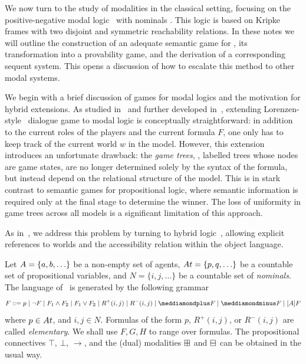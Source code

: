
We now turn to the study of modalities in the classical setting, focusing on the positive-negative modal logic \PNL\ with nominals \cite{DBLP:journals/jolli/XiongA20,DBLP:journals/logcom/PedersenSA21}. This logic is based on Kripke frames with two disjoint and symmetric reachability relations. In these notes we will outline the construction of an adequate semantic game for \PNL, its transformation into a provability game, and the derivation of a corresponding sequent system. This opens a discussion of how to escalate this method to other modal systems.

We begin with a brief discussion of games for modal logics and the motivation for hybrid extensions. As studied in~\cite{blackburn-synthese} and further developed in~\cite{Robert-PhD}, extending Lorenzen-style~\cite{Lorenzen1978-LORDLJ-2} dialogue game to modal logic is conceptually straightforward: in addition to the current roles of the players and the current formula $F$, one only has to  keep track of the current world $w$ in the model. However, this extension introduces an unfortunate drawback: the {\em game trees}, \ie, labelled trees whose nodes are game states, are no longer determined solely by the syntax of the formula, but instead depend on the relational structure of the model. This is in stark contrast to semantic games for propositional logic, where semantic information is required only at the final stage to determine the winner. The loss of uniformity in game trees across all models is a significant limitation of this approach.

As in~\cite{blackburn-synthese,DBLP:conf/wollic/Freiman21}, we address this problem by turning to hybrid logic~\cite{DBLP:journals/jolli/BlackburnS95,DBLP:journals/japll/BraunerP06,brauner2010hybrid}, allowing explicit references to worlds and the accessibility relation within the object language. 

Let $\A=\{\ag,\b,\ldots\}$ be a non-empty set of agents,
$\At=\{p,q,\ldots\}$ be a countable set of propositional variables, and $N=\{i,j,\ldots\}$ be a countable set of \emph{nominals}. The language of \PNL~is generated by the following grammar
$$F  ::= p  \mid \neg F  \mid F_1  \wedge F_2  \mid F_1  \vee F_2  \mid  R^+(i,j)\mid R^-(i,j) \mid  \dplus F  \mid \dminus F \mid [A]F $$
where $p\in \At$, and $i,j\in N$.  Formulas of the form $p$, $R^+(i,j)$, or $R^-(i,j)$ are called \emph{elementary}. We shall use $F,G,H$ to range over formulas. 
The propositional connectives $\top$, $\bot$, $\to$, and the (dual)  modalities $\boxplus$ and $\boxminus$ can be obtained in the usual way. 

